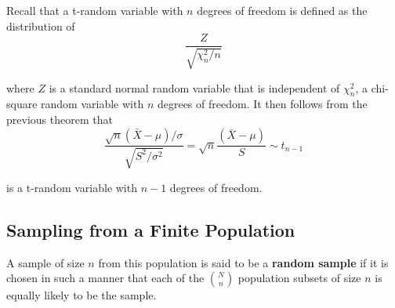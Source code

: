 \documentclass[12pt]{article}
\begin{document}
Recall that a t-random variable with $n$ degrees of freedom is defined as the distribution of
\begin{equation*}
  \frac{Z}{\sqrt{\chi_n^2 / n}}
\end{equation*}

where $Z$ is a standard normal random variable that is independent of $\chi_n^2$, a chi-square random variable with $n$ degrees of freedom. It then follows from the previous theorem that
\begin{equation*}
  \frac{\sqrt{n} (\bar{X} - \mu) / \sigma}{\sqrt{S^2 / \sigma^2}}
  = \sqrt{n} \frac{(\bar{X} - \mu)}{S} \sim t_{n-1}
\end{equation*}

is a t-random variable with $n-1$ degrees of freedom.

\subsection{Sampling from a Finite Population}

A sample of size $n$ from this population is said to be a \textbf{random sample} if it is chosen in such a manner that each of the $\binom {N}{n}$ population subsets of size $n$ is equally likely to be the sample.
\end{document}
